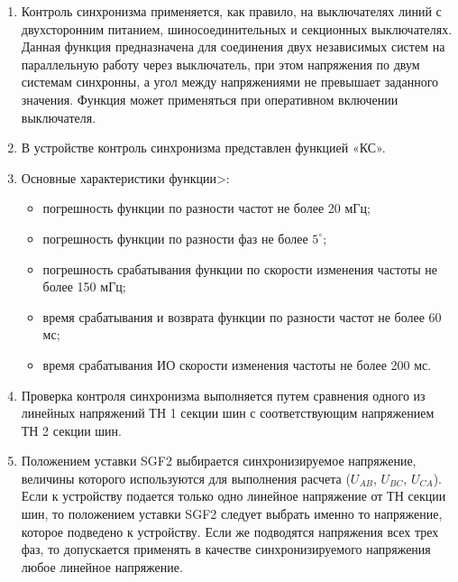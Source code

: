 
\color{black}

\begin{enumerate}

\item
Контроль синхронизма применяется, как правило, на выключателях линий с двухсторонним питанием, шиносоединительных и секционных выключателях. Данная функция предназначена для соединения двух независимых систем на параллельную работу через выключатель, при этом напряжения по двум системам синхронны, а угол между напряжениями не превышает заданного значения. Функция может применяться при оперативном включении выключателя.

\item
В устройстве контроль синхронизма представлен функцией «КС».

\item
Основные характеристики функции>:
\begin{itemize}
    \item погрешность функции по разности частот не более 20 мГц;
    \item погрешность функции по разности фаз не более $5^\circ$;
    \item погрешность срабатывания функции по скорости изменения частоты не более 150 мГц; 
    \item время срабатывания и возврата функции по разности частот не более 60 мс;
    \item время срабатывания ИО скорости изменения частоты не более 200 мс.
\end{itemize}

\item
Проверка контроля синхронизма выполняется путем сравнения одного из линейных напряжений ТН 1 секции шин с соответствующим напряжением ТН 2 секции шин.

\item
Положением уставки SGF2 выбирается синхронизируемое напряжение, величины которого используются для выполнения расчета ($U_{AB}$, $U_{BC}$, $U_{CA}$). Если к устройству подается только одно линейное напряжение от ТН секции шин, то положением уставки SGF2 следует выбрать именно то напряжение, которое подведено к устройству. Если же подводятся напряжения всех трех фаз, то допускается применять в качестве синхронизируемого напряжения любое линейное напряжение.


\end{enumerate}
